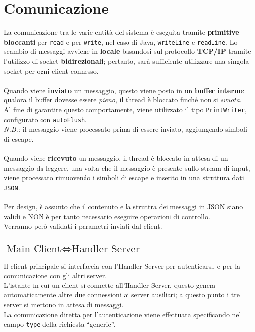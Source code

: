 \chapter{Comunicazione}
\noindent La comunicazione tra le varie entità del sistema è eseguita tramite \textbf{primitive bloccanti} per \texttt{read} e per \texttt{write}, nel caso di Java, \texttt{writeLine} e \texttt{readLine}. Lo scambio di messaggi avviene in \textbf{locale} basandosi sul protocollo \textbf{TCP/IP} tramite l'utilizzo di socket \textbf{bidirezionali}; pertanto, sarà sufficiente utilizzare una singola socket per ogni client connesso.\\
\\
\noindent Quando viene \textbf{inviato} un messaggio, questo viene posto in un \textbf{buffer interno}: qualora il buffer dovesse essere \textit{pieno}, il thread è bloccato finché non si \textit{svuota}.\\
Al fine di garantire questo comportamente, viene utilizzato il tipo \texttt{PrintWriter}, configurato con \texttt{autoFlush}.\\
\textit{N.B.:} il messaggio viene processato prima di essere inviato, aggiungendo simboli di escape.\\
\\
Quando viene \textbf{ricevuto} un messaggio, il thread è bloccato in attesa di un messaggio da leggere, una volta che il messaggio è presente sullo stream di input, viene processato rimuovendo i simboli di escape e inserito in una struttura dati \texttt{JSON}.\\
\\
\noindent Per design, è assunto che il contenuto e la struttra dei messaggi in JSON siano validi e NON è per tanto necessario eseguire operazioni di controllo.\\
Verranno però validati i parametri inviati dal client.

\section{$\text{Main Client} \Leftrightarrow \text{Handler Server}$}
\noindent Il client principale si interfaccia con l’Handler Server per autenticarsi, e per la comunicazione con gli altri server.\\
L’istante in cui un client si connette all’Handler Server, questo genera automaticamente altre due connessioni ai server ausiliari; a questo punto i tre server si mettono in attesa di messaggi.\\
La comunicazione diretta per l’autenticazione viene effettuata specificando nel campo \texttt{type} della richiesta “generic”.
